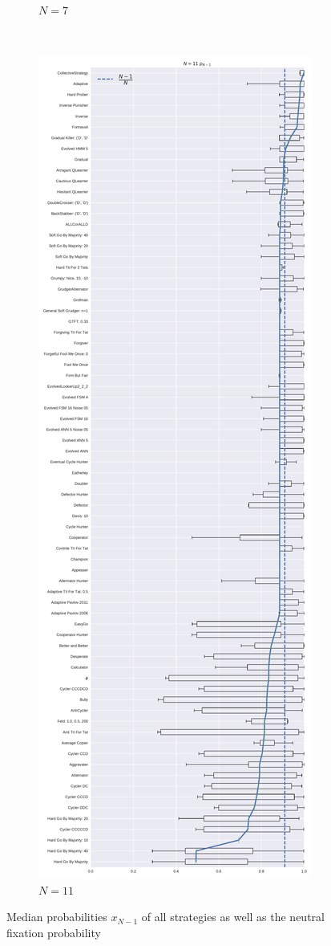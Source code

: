 \documentclass{article}
\begin{document}
\begin{figure}[!hbtp]
\begin{subfigure}[t]{.3\textwidth}
        \caption{\(N=7\)}
    \end{subfigure}%
    ~
    \begin{subfigure}[t]{.3\textwidth}
        \centering
        \includegraphics[width=\textwidth]{../img/boxplot_11_resist.pdf}
        \caption{\(N=11\)}
    \end{subfigure}%

    \caption{Median probabilities \(x_{N-1}\) of all strategies as well as the
    neutral fixation probability}
    \label{fig:fixation_boxplot_resist}
\end{figure}
\end{document}
